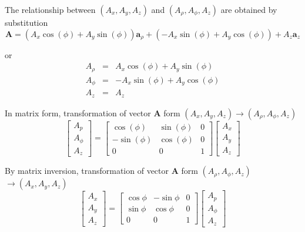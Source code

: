 \documentclass{article}
\begin{document}
The relationship between $\left( A_{x},A_{y},A_{z}\right) $ and $\left(
A_{\rho },A_{\phi },A_{z}\right) $ are obtained by substitution%
\[
\mathbf{A=}\left( A_{x}\cos \left( \phi \right) +A_{y}\sin \left( \phi
\right) \right) \mathbf{a}_{\rho }+\left( -A_{x}\sin \left( \phi \right)
+A_{y}\cos \left( \phi \right) \right) +A_{z}\mathbf{a}_{z} 
\]

or 
\begin{eqnarray*}
A_{\rho } &=&A_{x}\cos \left( \phi \right) +A_{y}\sin \left( \phi \right) \\
A_{\phi } &=&-A_{x}\sin \left( \phi \right) +A_{y}\cos \left( \phi \right) \\
A_{z} &=&A_{z}
\end{eqnarray*}

In matrix form, transformation of vector $\mathbf{A}$ form $\left(
A_{x},A_{y},A_{z}\right) \longrightarrow \left( A_{\rho },A_{\phi
},A_{z}\right) $ 
\[
\left[ 
\begin{array}{c}
A_{p} \\ 
A_{\phi } \\ 
A_{z}%
\end{array}%
\right] =\left[ 
\begin{array}{ccc}
\cos \left( \phi \right) & \sin \left( \phi \right) & 0 \\ 
-\sin \left( \phi \right) & \cos \left( \phi \right) & 0 \\ 
0 & 0 & 1%
\end{array}%
\right] \left[ 
\begin{array}{c}
A_{x} \\ 
A_{y} \\ 
A_{z}%
\end{array}%
\right] 
\]

By matrix inversion, transformation of vector $\mathbf{A}$ form $\left(
A_{\rho },A_{\phi },A_{z}\right) $ $\longrightarrow \left(
A_{x},A_{y},A_{z}\right) $ 
\[
\left[ 
\begin{array}{c}
A_{x} \\ 
A_{y} \\ 
A_{z}%
\end{array}%
\right] =\left[ 
\begin{array}{ccc}
\cos \phi & -\sin \phi & 0 \\ 
\sin \phi & \cos \phi & 0 \\ 
0 & 0 & 1%
\end{array}%
\right] \left[ 
\begin{array}{c}
A_{p} \\ 
A_{\phi } \\ 
A_{z}%
\end{array}%
\right] 
\]
\end{document}
